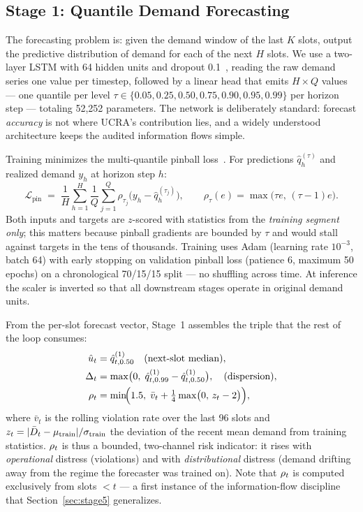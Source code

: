 \subsection{Stage 1: Quantile Demand Forecasting}
\label{sec:stage1}

The forecasting problem is: given the demand window of the last $K$
slots, output the predictive distribution of demand for each of the
next $H$ slots. We use a two-layer LSTM with 64 hidden units and
dropout 0.1~\cite{hochreiter1997lstm}, reading the raw demand series
one value per timestep, followed by a linear head that emits
$H \times Q$ values --- one quantile per level
$\tau \in \{0.05, 0.25, 0.50, 0.75, 0.90, 0.95, 0.99\}$ per horizon
step --- totaling 52{,}252 parameters. The network is deliberately
standard: forecast \emph{accuracy} is not where UCRA's contribution
lies, and a widely understood architecture keeps the audited
information flows simple.

Training minimizes the multi-quantile pinball
loss~\cite{koenker1978regression}. For predictions
$\hat q^{(\tau)}_h$ and realized demand $y_h$ at horizon step $h$:
\begin{equation}
\mathcal{L}_{\text{pin}} \;=\; \frac{1}{H}\sum_{h=1}^{H}
\frac{1}{Q}\sum_{j=1}^{Q}
\rho_{\tau_j}\!\bigl(y_h - \hat q^{(\tau_j)}_h\bigr),
\qquad
\rho_\tau(e) = \max\bigl(\tau e,\, (\tau-1)e\bigr).
\label{eq:pinball}
\end{equation}
Both inputs and targets are $z$-scored with statistics from the
\emph{training segment only}; this matters because pinball gradients
are bounded by $\tau$ and would stall against targets in the tens of
thousands. Training uses Adam (learning rate $10^{-3}$, batch 64)
with early stopping on validation pinball loss (patience 6, maximum
50 epochs) on a chronological 70/15/15 split --- no shuffling across
time. At inference the scaler is inverted so that all downstream
stages operate in original demand units.

From the per-slot forecast vector, Stage~1 assembles the triple that
the rest of the loop consumes:
\begin{align}
\hat{u}_t &= \hat q_{t,0.50}^{(1)} \quad \text{(next-slot median)}, \label{eq:uhat}\\
\Delta_t &= \max\bigl(0,\; \hat q_{t,0.99}^{(1)} - \hat q_{t,0.50}^{(1)}\bigr),
\quad \text{(dispersion)}, \label{eq:spread}\\
\rho_t &= \min\!\Bigl(1.5,\; \bar v_t + \tfrac{1}{4}\max\bigl(0,\, z_t - 2\bigr)\Bigr),
\label{eq:rho}
\end{align}
where $\bar v_t$ is the rolling violation rate over the last 96 slots
and $z_t = |\bar{D}_t - \mu_{\text{train}}| / \sigma_{\text{train}}$
the deviation of the recent mean demand from training statistics.
$\rho_t$ is thus a bounded, two-channel risk indicator: it rises with
\emph{operational} distress (violations) and with \emph{distributional}
distress (demand drifting away from the regime the forecaster was
trained on). Note that $\rho_t$ is computed exclusively from slots
$< t$ --- a first instance of the information-flow discipline that
Section~\ref{sec:stage5} generalizes.

